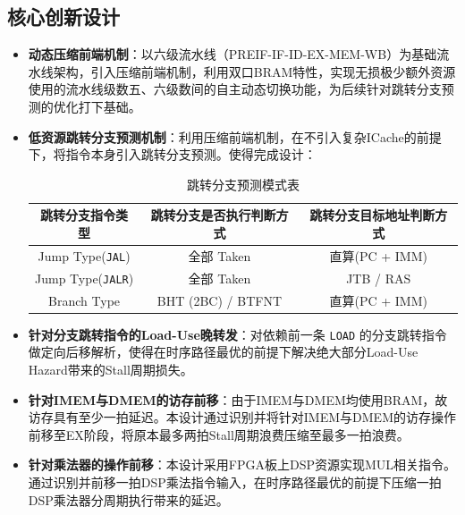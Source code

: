 ﻿\documentclass[12pt,a4paper]{ctexart}
\begin{document}
\subsection{核心创新设计}
\begin{itemize}
    \item \textbf{动态压缩前端机制}：以六级流水线（PREIF-IF-ID-EX-MEM-WB）为基础流水线架构，引入压缩前端机制，利用双口BRAM特性，实现无损极少额外资源使用的流水线级数五、六级数间的自主动态切换功能，为后续针对跳转分支预测的优化打下基础。
    \item \textbf{低资源跳转分支预测机制}：利用压缩前端机制，在不引入复杂ICache的前提下，将指令本身引入跳转分支预测。使得完成设计：

\begin{table}[H]
    \centering
    \begin{tabular}{|c|c|c|}\hline
 跳转分支指令类型& 跳转分支是否执行判断方式&跳转分支目标地址判断方式\\\hline\hline
         Jump Type(\texttt{JAL})&  全部 Taken& 直算(PC + IMM)\\\hline
         Jump Type(\texttt{JALR})&  全部 Taken& JTB / RAS\\\hline
         Branch Type&  BHT (2BC) / BTFNT& 直算(PC + IMM)\\ \hline
    \end{tabular}
    \caption{跳转分支预测模式表}
\end{table}
    \item \textbf{针对分支跳转指令的Load-Use晚转发}：对依赖前一条 \texttt{LOAD} 的分支跳转指令做定向后移解析，使得在时序路径最优的前提下解决绝大部分Load-Use Hazard带来的Stall周期损失。
    \item \textbf{针对IMEM与DMEM的访存前移}：由于IMEM与DMEM均使用BRAM，故访存具有至少一拍延迟。本设计通过识别并将针对IMEM与DMEM的访存操作前移至EX阶段，将原本最多两拍Stall周期浪费压缩至最多一拍浪费。
    \item \textbf{针对乘法器的操作前移}：本设计采用FPGA板上DSP资源实现MUL相关指令。通过识别并前移一拍DSP乘法指令输入，在时序路径最优的前提下压缩一拍DSP乘法器分周期执行带来的延迟。
\end{itemize}
\newpage
\end{document}
